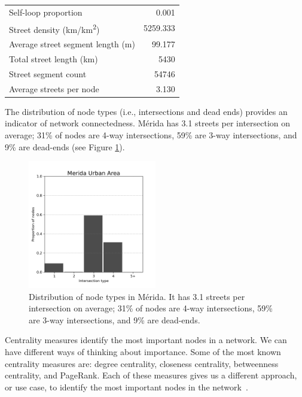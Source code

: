 \begin{table}[htbp]
\begin{tabular}{ l r }
    Self-loop proportion                             & 0.001        \\
    Street density (km/km\textsuperscript{2})        & 5259.333        \\
    Average street segment length (m)                & 99.177        \\
    Total street length (km)                         & 5430     \\
    Street segment count                             & 54746      \\
    Average streets per node                         & 3.130         \\
    \bottomrule
  \end{tabular}
\end{table}

The distribution of node types (i.e., intersections and dead ends) provides an indicator of network connectedness.
Mérida has 3.1 streets per intersection on average; 31\% of nodes are 4-way intersections, 59\% are 3-way intersections, and 9\% are dead-ends (see Figure \ref{fig:merida-node-types-distribution}).

\begin{figure}[htpb]
  \centering
  \includegraphics[width=0.5\textwidth]{Figures/merida-street-per-node-proportion-distribution.png}
  \caption{Distribution of node types in Mérida. It has 3.1 streets per intersection on average; 31\% of nodes are 4-way intersections, 59\% are 3-way intersections, and 9\% are dead-ends.
    \label{fig:merida-node-types-distribution}}
\end{figure}

Centrality measures identify the most important nodes in a network.
We can have different ways of thinking about importance.
Some of the most known centrality measures are: degree centrality, closeness centrality, betweenness centrality, and PageRank.
Each of these measures gives us a different approach, or use case, to identify the most important nodes in the network~\cite{menczer_fortunato_davis_2020}.

